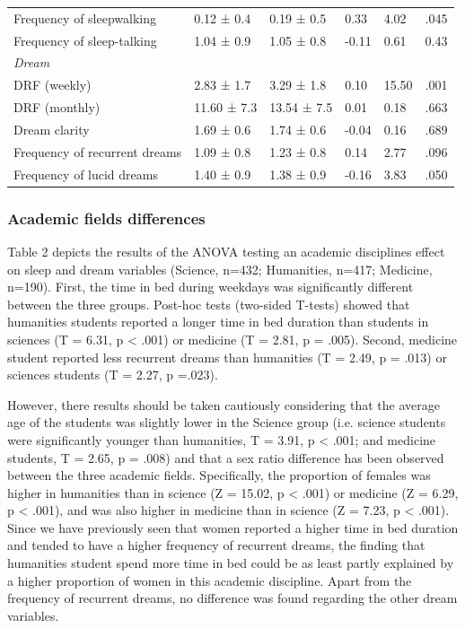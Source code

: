 \begin{table}[!htbp]
\begin{tabularx}{\textwidth}{lllXXX}
    Frequency of sleepwalking      & 0.12 ± 0.4                & 0.19 ± 0.5    & 0.33  & 4.02  & .045     \\
    Frequency of sleep-talking     & 1.04 ± 0.9                & 1.05 ± 0.8    & -0.11 & 0.61  & 0.43     \\
    \emph{Dream}                   &                           &               &       &       &          \\
    DRF (weekly)                   & 2.83 ± 1.7                & 3.29 ± 1.8    & 0.10  & 15.50 & .001     \\
    DRF (monthly)                  & 11.60 ± 7.3               & 13.54 ± 7.5   & 0.01  & 0.18  & .663     \\
    Dream clarity                  & 1.69 ± 0.6                & 1.74 ± 0.6    & -0.04 & 0.16  & .689     \\
    Frequency of recurrent dreams  & 1.09 ± 0.8                & 1.23 ± 0.8    & 0.14  & 2.77  & .096     \\
    Frequency of lucid dreams      & 1.40 ± 0.9                & 1.38 ± 0.9    & -0.16 & 3.83  & .050     \\ \bottomrule
    \end{tabularx}%
\end{table}

\subsubsection*{Academic fields differences}
Table 2 depicts the results of the ANOVA testing an academic disciplines effect on sleep and dream variables (Science, n=432; Humanities, n=417; Medicine, n=190). First, the time in bed during weekdays was significantly different between the three groups. Post-hoc tests (two-sided T-tests) showed that humanities students reported a longer time in bed duration than students in sciences (T = 6.31, p < .001) or medicine (T = 2.81, p = .005). Second, medicine student reported less recurrent dreams than humanities (T = 2.49, p = .013) or sciences students (T = 2.27, p =.023).

However, there results should be taken cautiously considering that the average age of the students was slightly lower in the Science group (i.e. science students were significantly younger than humanities, T = 3.91, p < .001; and medicine students, T = 2.65, p = .008) and that a sex ratio difference has been observed between the three academic fields. Specifically, the proportion of females was higher in humanities than in science (Z = 15.02, p < .001) or medicine (Z = 6.29, p < .001), and was also higher in medicine than in science (Z = 7.23, p < .001). Since we have previously seen that women reported a higher time in bed duration and tended to have a higher frequency of recurrent dreams, the finding that humanities student spend more time in bed could be as least partly explained by a higher proportion of women in this academic discipline. Apart from the frequency of recurrent dreams, no difference was found regarding the other dream variables.

